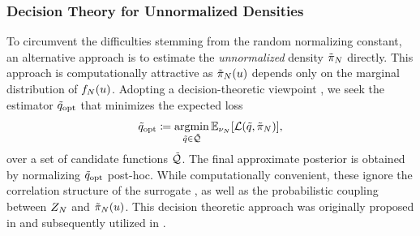 \documentclass[12pt]{article}
\begin{document}
\subsubsection{Decision Theory for Unnormalized Densities} \label{sec:decision-theory}
To circumvent the difficulties stemming from the random normalizing constant, an alternative approach
is to estimate the \textit{unnormalized} density ${\tilde{\pi}}_{N}$ directly. This approach is computationally 
attractive as ${\tilde{\pi}}_{N}(u)$ depends only on the marginal distribution of $f_{N}(u)$. Adopting a 
decision-theoretic viewpoint \citep{SinsbeckNowak}, we seek the estimator $\tilde{q}_{\mathrm{opt}}$ that minimizes the 
expected loss
\begin{equation}
\tilde{q}_{\mathrm{opt}} \coloneqq \operatorname*{argmin}_{\tilde{q} \in \tilde{\mathcal{Q}}} \mathbb{E}_{\nu_{N}}[\mathcal{L}(\tilde{q}, {\tilde{\pi}}_{N})],
\label{eq:decision-theory}
\end{equation}
over a set of candidate functions $\tilde{\mathcal{Q}}$. The final approximate posterior is obtained by normalizing 
$\tilde{q}_{\mathrm{opt}}$ post-hoc. While computationally convenient, these  ignore the 
correlation structure of the surrogate \citep{ourSurrPropPaper}, as well as the probabilistic coupling between
${Z}_{N}$ and ${\tilde{\pi}}_{N}(u)$. This decision theoretic approach was originally proposed in 
\citet{SinsbeckNowak} and subsequently utilized in \citet{VehtariParallelGP,gpEmMCMC,StuartTeck2}.
\end{document}
